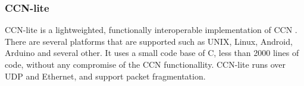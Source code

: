 % 




\subsubsection{CCN-lite}
CCN-lite is a lightweighted, functionally interoperable implementation of CCN \cite{CCN-LITE}. There are several platforms that are supported such as UNIX, Linux, Android, Arduino and several other. It uses a small code base of C, less than 2000 lines of code, without any compromise of the CCN functionallity. CCN-lite runs over UDP and Ethernet, and support packet fragmentation.
\\




















